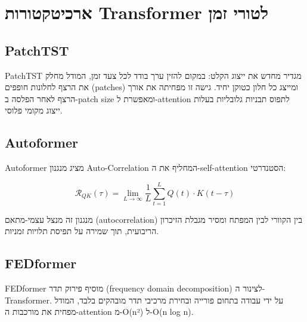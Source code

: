 
\clearpage
\chapter{ארכיטקטורות \textenglish{Transformer} לטורי זמן}

\section{\textenglish{PatchTST}}

\textenglish{PatchTST} \cite{nie2022patchtst} מגדיר מחדש את ייצוג הקלט: במקום להזין ערך בודד לכל צעד זמן, המודל מחלק את הרצף לחלונות חופפים (\textenglish{patches}) ומייצג כל חלון כטוקן יחיד. גישה זו מפחיתה את אורך הרצף לאחר הפלסה ב-\textenglish{patch size} ומאפשרת ל-\textenglish{attention} לתפוס תבניות גלובליות בעלות ייצוג מקומי פלוסי.

\section{\textenglish{Autoformer}}

\textenglish{Autoformer} \cite{wu2021autoformer} מציג מנגנון \textenglish{Auto-Correlation} המחליף את ה-\textenglish{self-attention} הסטנדרטי:

\begin{equation}
\mathcal{R}_{QK}(\tau) = \lim_{L\to\infty} \frac{1}{L} \sum_{t=1}^L Q(t) \cdot K(t-\tau)
\end{equation}

מנגנון זה מנצל עצמי-מתאם (\textenglish{autocorrelation}) בין הקוורי לבין המפתח ומסיר מגבלת הזיכרון הריבועית, תוך שמירה על תפיסת תלויות זמניות.

\section{\textenglish{FEDformer}}

\textenglish{FEDformer} \cite{zhou2022fedformer} מוסיף פירוק תדר (\textenglish{frequency domain decomposition}) לצינור ה-\textenglish{Transformer}. על ידי עבודה בתחום פורייה ובחירת מרכיבי תדר מובהקים בלבד, המודל מפחית את מורכבות ה-\textenglish{attention} מ-\textenglish{O(n²)} ל-\textenglish{O(n log n)}.
